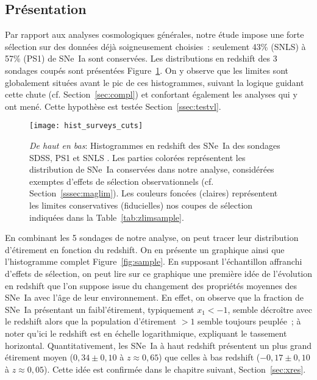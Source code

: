 \documentclass[../main/main.tex]{subfiles}
\begin{document}
\subsection{Présentation}\label{ssec:dataset}

Par rapport aux analyses cosmologiques générales, notre étude impose une forte
sélection sur des données déjà soigneusement choisies~: seulement 43\% (SNLS) à
57\% (PS1) de SNe~Ia sont conservées. Les distributions en redshift des 3
sondages coupés sont présentées Figure~\ref{fig:cuts}. On y observe que les
limites sont globalement situées avant le pic de ces histogrammes, suivant la
logique guidant cette chute (cf. Section~\ref{sec:compl}) et confortant
également les analyses qui y ont mené. Cette hypothèse est testée
Section~\ref{ssec:testvl}.

\begin{figure}
    \centering
    \texttt{[image: hist\_surveys\_cuts]}
    \caption[Histogrammes des sondages coupés pour notre étude]{\textit{De haut
        en bas}: Histogrammes en redshift des SNe~Ia des sondages SDSS, PS1 et
        SNLS \citep[données de Pantheon,][]{scolnic2018}. Les parties colorées
        représentent les distribution de SNe~Ia conservées dans notre analyse,
        considérées exemptes d'effets de sélection observationnels (cf.
        Section~\ref{sssec:maglim}). Les couleurs foncées (claires) représentent
        les limites conservatives (fiducielles) nos coupes de sélection
    indiquées dans la Table~\ref{tab:zlimsample}.}
    \label{fig:cuts}
\end{figure}

En combinant les 5 sondages de notre analyse, on peut tracer leur distribution
d'étirement en fonction du redshift. On en présente un graphique ainsi que
l'histogramme complet Figure~\ref{fig:sample}. En supposant l'échantillon
affranchi d'effets de sélection, on peut lire sur ce graphique une première idée
de l'évolution en redshift que l'on suppose issue du changement des propriétés
moyennes des SNe~Ia avec l'âge de leur environnement. En effet, on observe que
la fraction de SNe~Ia présentant un faibl'étirement, typiquement $x_1 < -1$,
semble décroître avec le redshift alors que la population d'étirement $> 1$
semble toujours peuplée~; à noter qu'ici le redshift est en échelle
logarithmique, expliquant le tassement horizontal. Quantitativement, les SNe~Ia
à haut redshift présentent un plus grand étirement moyen ($0,34 \pm 0,10$ à
$z \approx 0,65$) que celles à bas redshift ($-0,17 \pm 0,10$ à $z \approx
0,05$). Cette idée est confirmée dans le chapitre suivant,
Section~\ref{sec:xres}.
\end{document}
